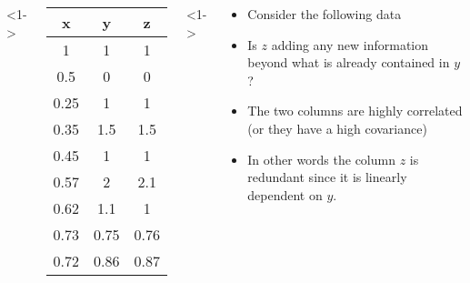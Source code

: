 \begin{frame}
  \begin{columns}
    <1->
    \begin{overlayarea}{\textwidth}{\textheight}
      \begin{table}[]
        \centering

        \label{my-label}
        \begin{tabular}{ccc}
          \hline
          \textbf{x} & \textbf{y} & \textbf{z} \\ \hline
          1          & 1          & 1          \\
          0.5        & 0          & 0          \\
          0.25       & 1          & 1          \\
          0.35       & 1.5        & 1.5        \\
          0.45       & 1          & 1          \\
          0.57       & 2          & 2.1        \\
          0.62       & 1.1        & 1          \\
          0.73       & 0.75       & 0.76       \\
          0.72       & 0.86       & 0.87       \\
          \hline
        \end{tabular}
      \end{table}
    \end{overlayarea}

    <1->
    \begin{overlayarea}{\textwidth}{\textheight}
      \begin{itemize}\justifying
        \item<1-> Consider the following data
        \item<2-> Is $z$ adding any new information beyond what is already contained in $y$?
        \item<3-> The two columns are highly correlated (or they have a high covariance)
        \item<4-> In other words the column $z$ is redundant since it is linearly dependent on $y$.
      \end{itemize}
    \end{overlayarea}
  \end{columns}
\end{frame}


